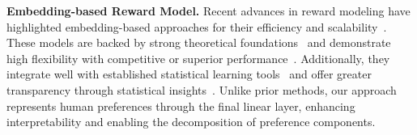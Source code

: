 
\noindent\textbf{Embedding-based Reward Model.} 
Recent advances in reward modeling have highlighted embedding-based approaches for their efficiency and scalability~\citep{ahmed2024scalable,sun2023query,zhang2024general}. These models are backed by strong theoretical foundations~\citep{sun2024rethinking} and demonstrate high flexibility with competitive or superior performance~\citep{li2024q,tennenholtz2024embedding}. Additionally, they integrate well with established statistical learning tools~\citep{dykstra1960rank,springall1973response,han2020asymptotic} and offer greater transparency through statistical insights~\citep{shen2025reviving,feng2025pilaf}. Unlike prior methods, our approach represents human preferences through the final linear layer, enhancing interpretability and enabling the decomposition of preference components.


